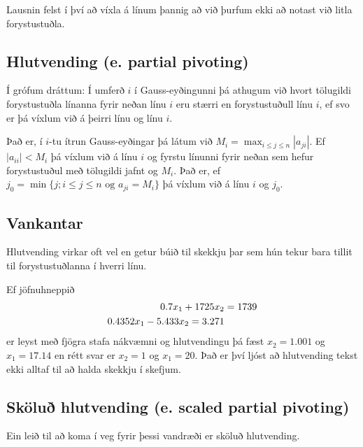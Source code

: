 \documentclass[letterpaper,10pt,icelandic]{sphinxmanual}
\begin{document}
Lausnin felst í því að víxla á línum þannig að við þurfum ekki að notast
við litla forystustuðla.


\subsection{Hlutvending (e. partial pivoting)}
\label{kafli08:index-5}\label{kafli08:hlutvending-e-partial-pivoting}
Í grófum dráttum: Í umferð \(i\) í Gauss-eyðingunni þá athugum við
hvort tölugildi forystustuðla línanna fyrir neðan línu \(i\) eru
stærri en forystustuðull línu \(i\), ef svo er þá víxlum við á
þeirri línu og línu \(i\).

Það er, í \(i\)-tu ítrun Gauss-eyðingar þá látum við
\(M_i = \max_{i\leq j \leq n} |a_{ji}|\). Ef \(|a_{ii}| < M_i\)
þá víxlum við á línu \(i\) og fyrstu línunni fyrir neðan sem hefur
forystustuðul með tölugildi jafnt og \(M_i\). Það er, ef
\(j_0 = \min\{ j ; i \leq j\leq n \text{ og } a_{ji} = M_i \}\) þá
víxlum við á línu \(i\) og \(j_0\).


\subsection{Vankantar}
\label{kafli08:vankantar}
Hlutvending virkar oft vel en getur búið til skekkju þar sem hún tekur
bara tillit til forystustuðlanna í hverri línu.

Ef jöfnuhneppið
\begin{gather}
\begin{split}\begin{aligned}
0.7 x_1 + 1725 x_2 &= 1739\\
0.4352 x_1 - 5.433 x_2 = 3.271
\end{aligned}\end{split}\notag
\end{gather}
er leyst með fjögra stafa nákvæmni og hlutvendingu þá fæst
\(x_2=1.001\) og \(x_1=17.14\) en rétt
svar er \(x_2=1\) og \(x_1=20\). Það er því ljóst að hlutvending
tekst ekki alltaf til að halda skekkju í skefjum.


\subsection{Sköluð hlutvending (e. scaled partial pivoting)}
\label{kafli08:skolu-hlutvending-e-scaled-partial-pivoting}\label{kafli08:index-6}
Ein leið til að koma í veg fyrir þessi vandræði er sköluð hlutvending.
\end{document}
